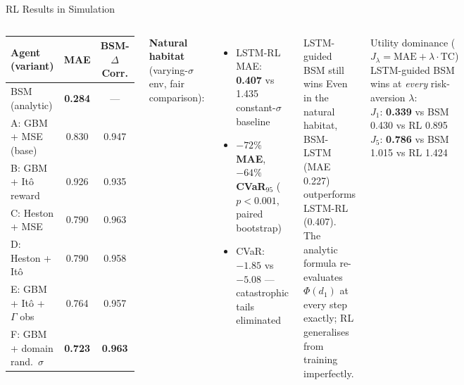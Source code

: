 \documentclass[aspectratio=169,10pt]{beamer}
\newcommand{\best}[1]{\cellcolor{teal!18}\textbf{#1}}
\begin{document}
\begin{frame}{RL Results in Simulation}
\begin{columns}[T]
\begin{center}
\small
\begin{tabular}{lcc}
\toprule
Agent (variant) & MAE & BSM-$\Delta$ Corr. \\
\midrule
BSM (analytic) & \best{0.284} & --- \\
A: GBM + MSE (base) & 0.830 & 0.947 \\
B: GBM + It\^{o} reward & 0.926 & 0.935 \\
C: Heston + MSE & 0.790 & 0.963 \\
D: Heston + It\^{o} & 0.790 & 0.958 \\
E: GBM + It\^{o} + $\Gamma$ obs & 0.764 & 0.957 \\
F: GBM + domain rand.\ $\sigma$ & \best{0.723} & \textbf{0.963} \\
\bottomrule
\end{tabular}
\end{center}

\medskip
\textbf{Natural habitat} (varying-$\sigma$ env, fair comparison):
\begin{itemize}\itemsep1pt
  \item LSTM-RL MAE: \textbf{0.407} vs 1.435 constant-$\sigma$ baseline
  \item \textbf{$-72\%$ MAE}, \textbf{$-64\%$ CVaR$_{95}$} ($p < 0.001$, paired bootstrap)
  \item CVaR: $-1.85$ vs $-5.08$ — catastrophic tails eliminated
\end{itemize}

\begin{exampleblock}{LSTM-guided BSM still wins}
Even in the natural habitat, BSM-LSTM (MAE 0.227) outperforms LSTM-RL (0.407). The analytic formula re-evaluates $\Phi(d_1)$ at every step exactly; RL generalises from training imperfectly.
\end{exampleblock}

\medskip
\begin{block}{Utility dominance ($J_\lambda = \text{MAE} + \lambda\cdot\text{TC}$)}
LSTM-guided BSM wins at \emph{every} risk-aversion $\lambda$:\\
$J_1$: \textbf{0.339} vs BSM 0.430 vs RL 0.895\\
$J_5$: \textbf{0.786} vs BSM 1.015 vs RL 1.424
\end{block}
\end{columns}
\end{frame}
\end{document}
